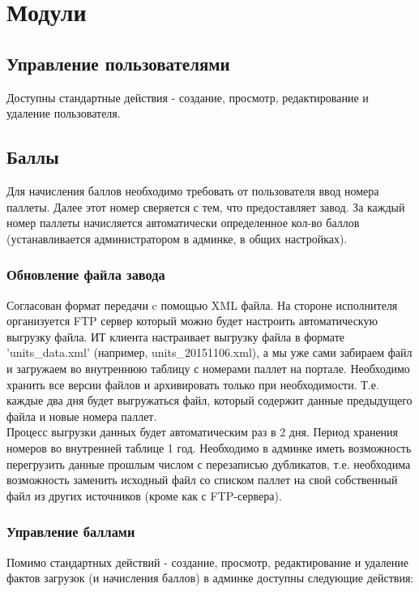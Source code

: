 \documentclass[DIV=calc, paper=a4, fontsize=11pt]{scrartcl} %
\begin{document}
\section{Модули} \label{sec:modules}

\subsection{Управление пользователями}
Доступны стандартные действия - создание, просмотр, редактирование и удаление пользователя.

\subsection{Баллы}

Для начисления баллов необходимо требовать от пользователя ввод номера паллеты. Далее этот номер сверяется с тем, что предоставляет завод. За каждый номер паллеты начисляется автоматически определенное кол-во баллов (устанавливается администратором в админке, в общих настройках).

\subsubsection{Обновление файла завода}

Согласован формат передачи c помощью XML файла. На стороне исполнителя организуется FTP сервер который можно будет настроить автоматическую выгрузку файла. ИТ клиента настраивает выгрузку файла в формате 'units\_data.xml' (например, units\_20151106.xml), а мы уже сами забираем файл и загружаем во внутреннюю таблицу с номерами паллет на портале. Необходимо хранить все версии файлов и архивировать только при необходимости. Т.е. каждые два дня будет выгружаться файл, который содержит данные предыдущего файла и новые номера паллет.
\\[0.5cm]
Процесс выгрузки данных будет автоматическим раз в 2 дня. Период хранения номеров во внутренней таблице 1 год. Необходимо в админке иметь возможность перегрузить данные прошлым числом с перезаписью дубликатов, т.е. необходима возможность заменить исходный файл со списком паллет на свой собственный файл из других источников (кроме как с FTP-сервера).

\subsubsection{Управление баллами}
Помимо стандартных действий - создание, просмотр, редактирование и удаление фактов загрузок (и начисления баллов) в админке доступны следующие действия:
\end{document}
